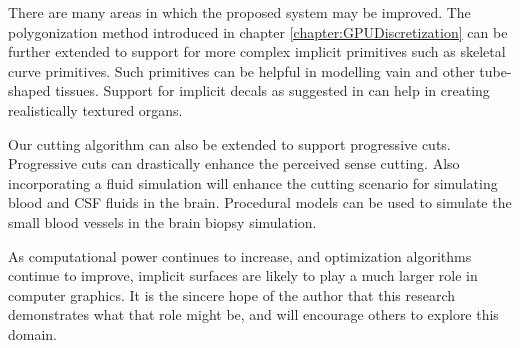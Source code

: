 There are many areas in which the proposed system may be improved. The polygonization method introduced in chapter \ref{chapter:GPUDiscretization} can be further 
extended to support for more complex implicit primitives such as skeletal curve primitives. Such primitives can be helpful in modelling vain and other tube-shaped
tissues. Support for implicit decals as suggested in \cite{Schmidtb} can help in creating realistically textured organs. 

Our cutting algorithm can also be extended to support progressive cuts. Progressive cuts can drastically enhance the perceived sense cutting. 
Also incorporating a fluid simulation will enhance the cutting scenario for simulating blood and CSF fluids in the brain.
Procedural models can be used to simulate the small blood vessels in the brain biopsy simulation. 

As computational power continues to increase, and optimization algorithms continue to improve, implicit surfaces are likely to play a much larger 
role in computer graphics. It is the sincere hope of the author that this research demonstrates what that role might be, and will encourage others
to explore this domain.

